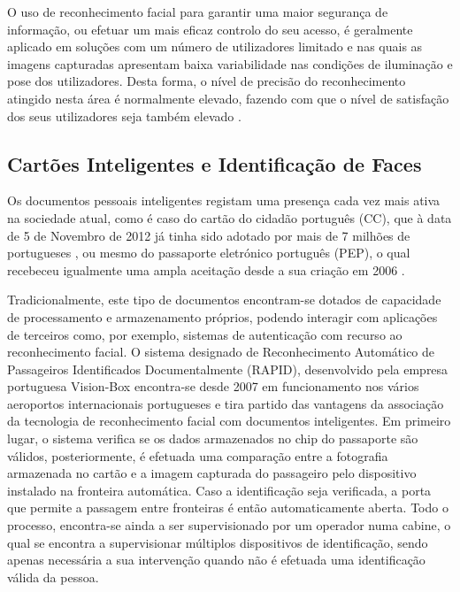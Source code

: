 O uso de reconhecimento facial para garantir uma maior segurança de informação, ou efetuar um mais eficaz controlo do seu acesso, é geralmente aplicado em soluções com um número de utilizadores limitado e nas quais as imagens capturadas apresentam baixa variabilidade nas condições de iluminação e pose dos utilizadores. Desta forma, o nível de precisão do reconhecimento atingido nesta área é normalmente elevado, fazendo com que o nível de satisfação dos seus utilizadores seja também elevado \cite{Li2011}.

\subsection{Cartões Inteligentes e Identificação de Faces} \label{CartoesInteligentes}
Os documentos pessoais inteligentes registam uma presença cada vez mais ativa na sociedade atual, como é caso do cartão do cidadão português (CC), que à data de 5 de Novembro de 2012 já tinha sido adotado por mais de 7 milhões de portugueses \cite{Administrativa}, ou mesmo do passaporte eletrónico português (PEP), o qual recebeceu igualmente uma ampla aceitação desde a sua criação em 2006 \cite{MinisteriodaAdministracaoInterna}.

Tradicionalmente, este tipo de documentos encontram-se dotados de capacidade de processamento e armazenamento próprios, podendo interagir com aplicações de terceiros como, por exemplo, sistemas de autenticação com recurso ao reconhecimento facial. O sistema designado de Reconhecimento Automático de Passageiros Identificados Documentalmente (RAPID)\cite{MinisteriodaAdministracaoInternaa}, desenvolvido pela empresa portuguesa Vision-Box \cite{Vision-Box} encontra-se desde 2007 em funcionamento nos vários aeroportos internacionais portugueses e tira partido das vantagens da associação da tecnologia de reconhecimento facial com documentos inteligentes. Em primeiro lugar, o sistema verifica se os dados armazenados no chip do passaporte são válidos, posteriormente, é efetuada uma comparação entre a fotografia armazenada no cartão e a imagem capturada do passageiro pelo dispositivo instalado na fronteira automática. Caso a identificação seja verificada, a porta que permite a passagem entre fronteiras é então automaticamente aberta. Todo o processo, encontra-se ainda a ser supervisionado por um operador numa cabine, o qual se encontra a supervisionar múltiplos dispositivos de identificação, sendo apenas necessária a sua intervenção quando não é efetuada uma identificação válida da pessoa.

